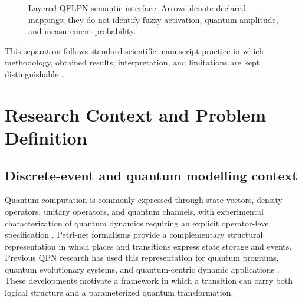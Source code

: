 \documentclass[final,3p,times]{elsarticle}
\begin{document}
\begin{figure}[tbp]
    \centering
    \caption{Layered QFLPN semantic interface. Arrows denote declared mappings; they do not identify fuzzy activation, quantum amplitude, and measurement probability.}
    \label{fig:qflpn-architecture-overview}
\end{figure}
 This separation follows standard scientific manuscript practice in which methodology, obtained results, interpretation, and limitations are kept distinguishable \cite{ref6,ref7}.

\section{Research Context and Problem Definition}

\subsection{Discrete-event and quantum modelling context}

Quantum computation is commonly expressed through state vectors, density operators, unitary operators, and quantum channels, with experimental characterization of quantum dynamics requiring an explicit operator-level specification \cite{ref16}. Petri-net formalisms provide a complementary structural representation in which places and transitions express state storage and events. Previous QPN research has used this representation for quantum programs, quantum evolutionary systems, and quantum-centric dynamic applications \cite{ref3,ref5,ref4}. These developments motivate a framework in which a transition can carry both logical structure and a parameterized quantum transformation.
\end{document}
